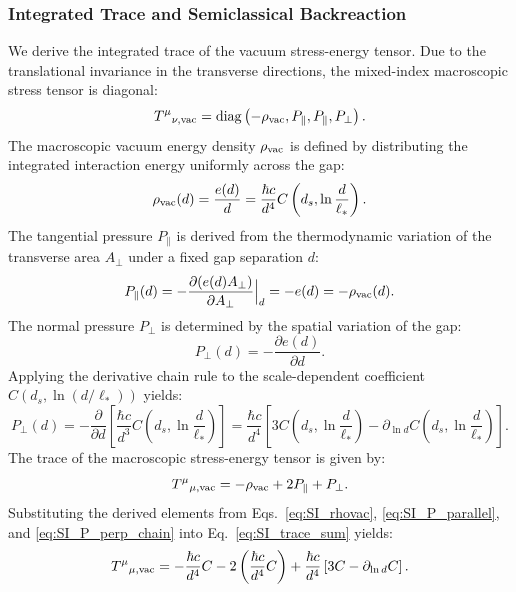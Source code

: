 \documentclass[12pt,letterpaper]{article}
\begin{document}
\subsubsection{Integrated Trace and Semiclassical Backreaction}
We derive the integrated trace of the vacuum stress-energy tensor. Due to the translational invariance in the transverse directions, the mixed-index macroscopic stress tensor is diagonal:
\begin{equation}
T^\mu{}_{\nu,\rm vac} = \mathrm{diag}\left(-\rho_{\rm vac}, P_\parallel, P_\parallel, P_\perp\right).
\label{eq:SI_diagonal}
\end{equation}
The macroscopic vacuum energy density $\rho_{\rm vac}$ is defined by distributing the integrated interaction energy uniformly across the gap:
\begin{equation}
\rho_{\rm vac}(d) = \frac{e(d)}{d} = \frac{\hbar c}{d^4} C\left(d_s, \ln\frac{d}{\ell_*}\right).
\label{eq:SI_rhovac}
\end{equation}
The tangential pressure $P_\parallel$ is derived from the thermodynamic variation of the transverse area $A_\perp$ under a fixed gap separation $d$:
\begin{equation}
P_\parallel(d) = -\frac{\partial (e(d) A_\perp)}{\partial A_\perp} \Big|_d = -e(d) = -\rho_{\rm vac}(d).
\label{eq:SI_P_parallel}
\end{equation}
The normal pressure $P_\perp$ is determined by the spatial variation of the gap:
\begin{equation}
P_\perp(d) = -\frac{\partial e(d)}{\partial d}.
\label{eq:SI_P_perp}
\end{equation}
Applying the derivative chain rule to the scale-dependent coefficient $C(d_s, \ln(d/\ell_*))$ yields:
\begin{equation}
P_\perp(d) = -\frac{\partial}{\partial d} \left[ \frac{\hbar c}{d^3} C\left(d_s, \ln\frac{d}{\ell_*}\right) \right] = \frac{\hbar c}{d^4} \left[ 3 C\left(d_s, \ln\frac{d}{\ell_*}\right) - \partial_{\ln d} C\left(d_s, \ln\frac{d}{\ell_*}\right) \right].
\label{eq:SI_P_perp_chain}
\end{equation}
The trace of the macroscopic stress-energy tensor is given by:
\begin{equation}
T^\mu{}_{\mu,\rm vac} = -\rho_{\rm vac} + 2P_\parallel + P_\perp.
\label{eq:SI_trace_sum}
\end{equation}
Substituting the derived elements from Eqs.~\eqref{eq:SI_rhovac}, \eqref{eq:SI_P_parallel}, and \eqref{eq:SI_P_perp_chain} into Eq.~\eqref{eq:SI_trace_sum} yields:
\begin{equation}
T^\mu{}_{\mu,\rm vac} = -\frac{\hbar c}{d^4} C - 2 \left( \frac{\hbar c}{d^4} C \right) + \frac{\hbar c}{d^4} \left[ 3 C - \partial_{\ln d} C \right].
\label{eq:SI_trace_sub}
\end{equation}
\end{document}
